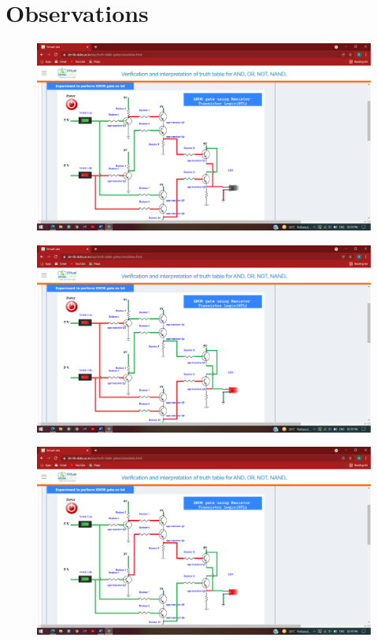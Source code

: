 \section{Observations}
	\begin{figure}[h]
		\centering
		\includegraphics[width=0.9\linewidth]{img/exp7/4}
		\caption{}
		\label{fig:7:4}
	\end{figure}
		\begin{figure}[h]
		\centering
		\includegraphics[width=0.9\linewidth]{img/exp7/5}
		\caption{}
		\label{fig:7:5}
	\end{figure}
		\begin{figure}[h]
		\centering
		\includegraphics[width=0.9\linewidth]{img/exp7/6}
		\caption{}
		\label{fig:7:6}
	\end{figure}
